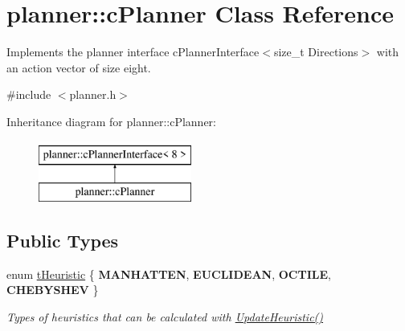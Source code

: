 \hypertarget{classplanner_1_1c_planner}{}\section{planner\+:\+:c\+Planner Class Reference}
\label{classplanner_1_1c_planner}


Implements the planner interface c\+Planner\+Interface$<$size\+\_\+t Directions$>$ with an action vector of size eight.  




{\ttfamily \#include $<$planner.\+h$>$}

Inheritance diagram for planner\+:\+:c\+Planner\+:\begin{figure}[H]
\begin{center}
\leavevmode
\includegraphics[height=2.000000cm]{classplanner_1_1c_planner}
\end{center}
\end{figure}
\subsection*{Public Types}
\begin{DoxyCompactItemize}
\item 
\mbox{\label{classplanner_1_1c_planner_a7f6dc4cbb69dd1ede14a67b0a7bd425b}} 
enum \mbox{\hyperlink{classplanner_1_1c_planner_a7f6dc4cbb69dd1ede14a67b0a7bd425b}{t\+Heuristic}} \{ {\bfseries M\+A\+N\+H\+A\+T\+T\+EN}, 
{\bfseries E\+U\+C\+L\+I\+D\+E\+AN}, 
{\bfseries O\+C\+T\+I\+LE}, 
{\bfseries C\+H\+E\+B\+Y\+S\+H\+EV}
 \}
\begin{DoxyCompactList}\small\item\em Types of heuristics that can be calculated with \mbox{\hyperlink{classplanner_1_1c_planner_ad32a7c58b885456ced172b66fed854f0}{Update\+Heuristic()}} \end{DoxyCompactList}\end{DoxyCompactItemize}
